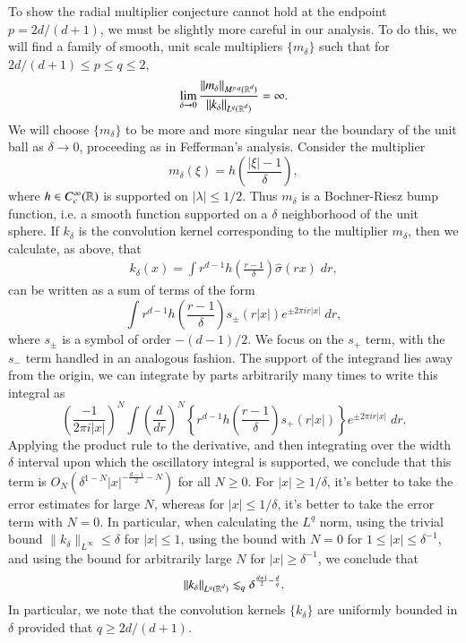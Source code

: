 To show the radial multiplier conjecture cannot hold at the endpoint $p = 2d/(d+1)$, we must be slightly more careful in our analysis. To do this, we will find a family of smooth, unit scale multipliers $\{ m_\delta \}$ such that for $2d/(d+1) \leq p \leq q \leq 2$,
%
\[ \lim_{\delta \to 0} \frac{\| m_\delta \|_{M^{p,q}(\operatorname{\mathbb{R}}^d)}}{\| k_\delta \|_{L^q(\operatorname{\mathbb{R}}^d)}} = \infty. \]
%
We will choose $\{ m_\delta \}$ to be more and more singular near the boundary of the unit ball as $\delta \to 0$, proceeding as in Fefferman's analysis. Consider the multiplier 
%
\[ m_\delta(\xi) = h \left( \frac{|\xi| - 1}{\delta} \right), \]
%
where $h \in C_c^\infty(\operatorname{\mathbb{R}})$ is supported on $|\lambda| \leq 1/2$. Thus $m_\delta$ is a Bochner-Riesz bump function, i.e. a smooth function supported on a $\delta$ neighborhood of the unit sphere. If $k_\delta$ is the convolution kernel corresponding to the multiplier $m_\delta$, then we calculate, as above, that
%
\begin{align*}
    k_\delta(x) = \int r^{d-1} h \left( \frac{r - 1}{\delta} \right) \widehat{\sigma}(rx)\; dr,
\end{align*}
%
can be written as a sum of terms of the form
%
\[ \int r^{d-1} h \left( \frac{r - 1}{\delta} \right) s_{\pm}(r|x|) e^{\pm 2 \pi i r |x|}\; dr, \]
%
where $s_{\pm}$ is a symbol of order $-(d-1)/2$. We focus on the $s_+$ term, with the $s_-$ term handled in an analogous fashion. The support of the integrand lies away from the origin, we can integrate by parts arbitrarily many times to write this integral as
%
\[ \left( \frac{-1}{2 \pi i |x|} \right)^N \int \left( \frac{d}{dr} \right)^N \left\{ r^{d-1} h \left( \frac{r-1}{\delta} \right) s_+(r|x|) \right\} e^{\pm 2 \pi i r |x|}\; dr. \]
%
Applying the product rule to the derivative, and then integrating over the width $\delta$ interval upon which the oscillatory integral is supported, we conclude that this term is $O_N( \delta^{1 - N} |x|^{- \frac{d-1}{2} -N} )$ for all $N \geq 0$. For $|x| \geq 1/\delta$, it's better to take the error estimates for large $N$, whereas for $|x| \leq 1/\delta$, it's better to take the error term with $N = 0$. In particular, when calculating the $L^q$ norm, using the trivial bound $\| k_\delta \|_{L^\infty} \leq \delta$ for $|x| \leq 1$, using the bound with $N = 0$ for $1 \leq |x| \leq \delta^{-1}$, and using the bound for arbitrarily large $N$ for $|x| \geq \delta^{-1}$, we conclude that
%
\[ \| k_\delta \|_{L^q(\operatorname{\mathbb{R}}^d)} \lesssim_q \delta^{\frac{d+1}{2} - \frac{d}{q}}. \]
%
In particular, we note that the convolution kernels $\{ k_\delta \}$ are uniformly bounded in $\delta$ provided that $q \geq 2d/(d+1)$.
